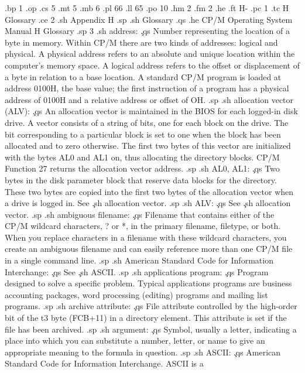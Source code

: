 .bp 1
.op
.cs 5
.mt 5
.mb 6
.pl 66
.ll 65
.po 10
.hm 2
.fm 2
.he 
.ft                                H-%
.pc 1
.tc H  Glossary
.ce 2
.sh
Appendix H
.sp
.sh
Glossary
.qs
.he CP/M Operating System Manual                          H  Glossary
.sp 3
.sh
address:  \c
.qs
Number representing the location of a byte in memory.  Within 
CP/M there are two kinds of addresses:  logical and physical.  A 
physical address refers to an absolute and unique location within 
the computer's memory space.  A logical address refers to the 
offset or displacement of a byte in relation to a base location.  
A standard CP/M program is loaded at address 0100H, the base 
value; the first instruction of a program has a physical address 
of 0100H and a relative address or offset of OH.
.sp
.sh
allocation vector (ALV):  \c
.qs
An allocation vector is maintained in the BIOS for each logged-in 
disk drive.  A vector consists of a string of bits, one for each 
block on the drive.  The bit corresponding to a particular block 
is set to one when the block has been allocated and to zero 
otherwise.  The first two bytes of this vector are initialized 
with the bytes AL0 and AL1 on, thus allocating the directory 
blocks.  CP/M Function 27 returns the allocation vector address.
.sp
.sh
AL0, AL1:  \c
.qs
Two bytes in the disk parameter block that reserve data blocks 
for the directory.  These two bytes are copied into the first two 
bytes of the allocation vector when a drive is logged in.  See \c
.sh
allocation vector.
.sp
.sh
ALV:  \c
.qs
See \c
.sh
allocation vector.
.sp
.sh
ambiguous filename:  \c
.qs
Filename that contains either of the CP/M wildcard characters, ? 
or *, in the primary filename, filetype, or both.  When you 
replace characters in a filename with these wildcard characters, 
you create an ambiguous filename and can easily reference more 
than one CP/M file in a single command line.
.sp
.sh
American Standard Code for Information Interchange:  \c
.qs
See \c
.sh
ASCII.
.sp
.sh
applications program:  \c
.qs
Program designed to solve a specific problem.  Typical 
applications programs are business accounting packages, word 
processing (editing) programs and mailing list programs.
.sp
.sh
archive attribute:  \c
.qs
File attribute controlled by the high-order bit of the t3 byte 
(FCB+11) in a directory element.  This attribute is set if the 
file has been archived.
.sp
.sh
argument:  \c
.qs
Symbol, usually a letter, indicating a place into which you can 
substitute a number, letter, or name to give an appropriate 
meaning to the formula in question.
.sp
.sh
ASCII:  \c
.qs
American Standard Code for Information Interchange.  ASCII is a 
